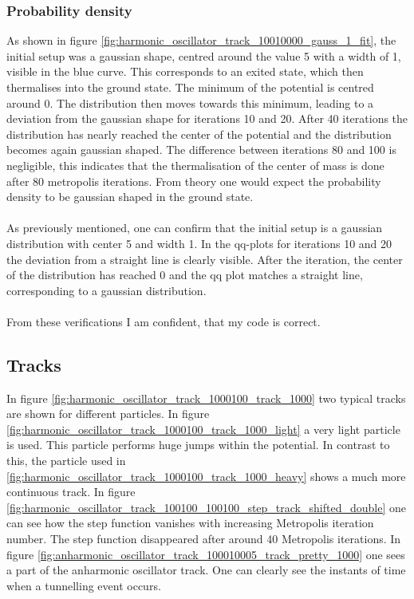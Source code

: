 \documentclass{scrartcl}
\begin{document}
	\subsubsection{Probability density}
		As shown in figure \ref{fig:harmonic_oscillator_track_10010000_gauss_1_fit}, the initial setup was a gaussian shape, centred around the value 5 with a width of 1, visible in the blue curve.
		This corresponds to an exited state, which then thermalises into the ground state.
		The minimum of the potential is centred around 0.
		The distribution then moves towards this minimum, leading to a deviation from the gaussian shape for iterations 10 and 20.
		After 40 iterations the distribution has nearly reached the center of the potential and the distribution becomes again gaussian shaped.
		The difference between iterations 80 and 100 is negligible, this indicates that the thermalisation of the center of mass is done after 80 metropolis iterations.
		From theory one would expect the probability density to be gaussian shaped in the ground state.
		\\\\
		As previously mentioned, one can confirm that the initial setup is a gaussian distribution with center 5 and width 1.
		In the qq-plots for iterations 10 and 20 the deviation from a straight line is clearly visible.
		After the  iteration, the center of the distribution has reached 0 and the qq plot matches a straight line, corresponding to a gaussian distribution.
		\\\\
		From these verifications I am confident, that my code is correct.

	\subsection{Tracks}
		In figure \ref{fig:harmonic_oscillator_track_1000100_track_1000} two typical tracks are shown for different particles.
		In figure \ref{fig:harmonic_oscillator_track_1000100_track_1000_light} a very light particle is used.
		This particle performs huge jumps within the potential.
		In contrast to this, the particle used in \ref{fig:harmonic_oscillator_track_1000100_track_1000_heavy} shows a much more continuous track.
		In figure \ref{fig:harmonic_oscillator_track_100100_100100_step_track_shifted_double} one can see how the step function vanishes with increasing Metropolis iteration number.
		The step function disappeared after around 40 Metropolis iterations.
		In figure \ref{fig:anharmonic_oscillator_track_100010005_track_pretty_1000} one sees a part of the anharmonic oscillator track.
		One can clearly see the instants of time when a tunnelling event occurs.
\end{document}

